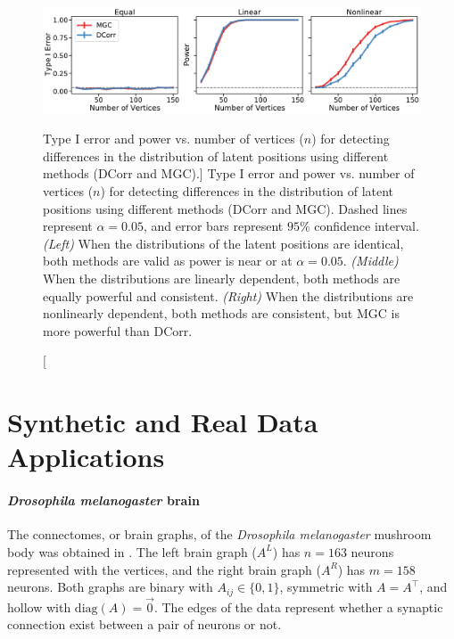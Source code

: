 \begin{figure}[hbt!]
    \centering
    \includegraphics[width=\linewidth]{figures/nonpar/simulations.pdf}
    \caption
    [Type I error and power vs. number of vertices ($n$) for detecting differences in the distribution of latent positions using different methods (DCorr and MGC).]
    {Type I error and power vs. number of vertices ($n$) for detecting differences in the distribution of latent positions using different methods (DCorr and MGC). Dashed lines represent $\alpha=0.05$, and error bars represent $95\%$ confidence interval.
    \textit{(Left)} When the distributions of the latent positions are identical, both methods are valid as power is near or at $\alpha=0.05$. \textit{(Middle)} When the distributions are linearly dependent, both methods are equally powerful and consistent. \textit{(Right)} When the distributions are nonlinearly dependent, both methods are consistent, but MGC is more powerful than DCorr.}
    \label{fig:simulations_nonpar}
\end{figure}

\section{Synthetic and Real Data Applications}

\paragraph{\textit{Drosophila melanogaster} brain}
The connectomes, or brain graphs, of the \textit{Drosophila melanogaster} mushroom body was obtained in \cite{eichler2017complete}. The left brain graph ($A^L$) has $n=163$ neurons represented with the vertices, and the right brain graph ($A^R$) has $m=158$ neurons. Both graphs are binary with $A_{i j} \in \{0, 1\}$, symmetric with $A= A^\top$, and hollow with $\text{diag}(A) = \vec 0$. The edges of the data represent whether a synaptic connection exist between a pair of neurons or not.

